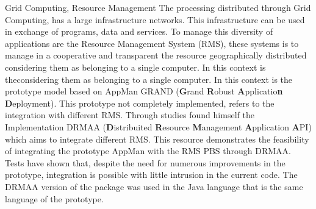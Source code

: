 \begin{englishabstract}{}{Grid Computing, Resource Management}
The processing distributed through Grid Computing, has a large infrastructure networks. This infrastructure can be used in exchange of programs, data and services. To manage this diversity of applications are the Resource Management System (RMS), these systems is to manage in a cooperative and transparent the resource geographically distributed considering them as belonging to a single computer. In this context is theconsidering them as belonging to a single computer. In this context is the prototype model based on AppMan GRAND ({\bf G}rand {\bf R}obust {\bf A}pplicatio{\bf n} {\bf D}eployment). This prototype not completely implemented, refers to the integration with different RMS. Through studies found himself the Implementation DRMAA ({\bf D}istribuited {\bf R}esource {\bf M}anagement {\bf A}pplication {\bf A}PI) which aims to integrate different RMS. This resource demonstrates the feasibility of integrating the prototype AppMan with the RMS PBS through DRMAA. Tests have shown that, despite the need for numerous improvements in the prototype, integration is possible with little intrusion in the current code. The DRMAA version of the package was used in the Java language that is the same language of the prototype.
\end{englishabstract}